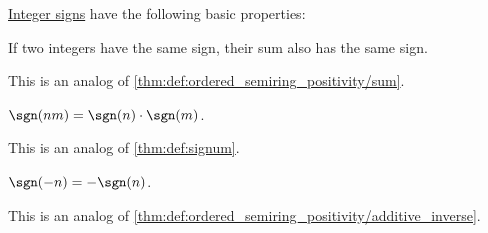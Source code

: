 \begin{proposition}\label{thm:def:integer_signum}
  \hyperref[def:integer_signum]{Integer signs} have the following basic properties:
  \begin{thmenum}
     If two integers have the same sign, their sum also has the same sign.

    This is an analog of \cref{thm:def:ordered_semiring_positivity/sum}.

     \( \sgn(nm) = \sgn(n) \cdot \sgn(m) \).

    This is an analog of \cref{thm:def:signum}.

     \( \sgn(-n) = -\sgn(n) \).

    This is an analog of \cref{thm:def:ordered_semiring_positivity/additive_inverse}.
  \end{thmenum}
\end{proposition}
